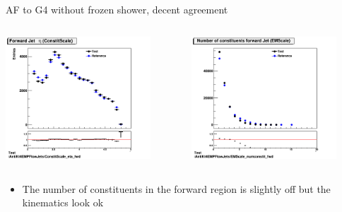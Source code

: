 \begin{frame}{AF to G4 without frozen shower, decent agreement}
    \begin{columns}
        \begin{column}{0.5\textwidth}
            \includegraphics[width=0.85\textwidth]{3r_eta_constit}
        \end{column}
        \begin{column}{0.5\textwidth}
            \includegraphics[width=0.85\textwidth]{3r_numconstit_EM}
        \end{column}
    \end{columns}
    \begin{itemize}
        \item The number of constituents in the forward region is slightly off but the kinematics look ok
    \end{itemize}
\end{frame}